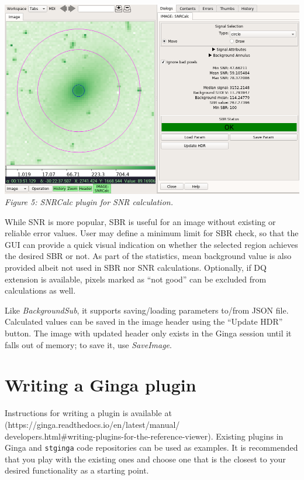 \documentclass[]{article}
\begin{document}
\begin{multicols}{3}
\para
\begin{center}
\includegraphics[width=8in]{plugin_snrcalc} \\
\vspace*{0.4em}
\label{fig:plugin_snrcalc}
{\small\em Figure 5: SNRCalc plugin for SNR calculation.}
\end{center}

\para
While SNR is more popular, SBR is useful for an image without existing or
reliable error values. User may define a minimum limit for SBR check,
so that the GUI can provide a quick visual indication on whether the
selected region achieves the desired SBR or not.
As part of the statistics, mean background value is also
provided albeit not used in SBR nor SNR calculations.
Optionally, if DQ extension is available, pixels marked as
``not good'' can be excluded from calculations as well.

\para
Like {\em BackgroundSub}, it supports saving/loading parameters to/from
JSON file.
Calculated values can be saved in the image header using the ``Update HDR''
button.
The image with updated header only exists in the Ginga session until it
falls out of memory; to save it, use {\em SaveImage}.

\section*{Writing a Ginga plugin}

\para
Instructions for writing a plugin is available at
(https://ginga.readthedocs.io/en/latest/manual/\\
developers.html#writing-plugins-for-the-reference-viewer).
Existing plugins in Ginga and {\tt stginga} code repositories can be used as
examples. It is recommended that you play with the existing ones and
choose one that is the closest to your desired functionality as a
starting point. 


\end{multicols}
\end{document}
